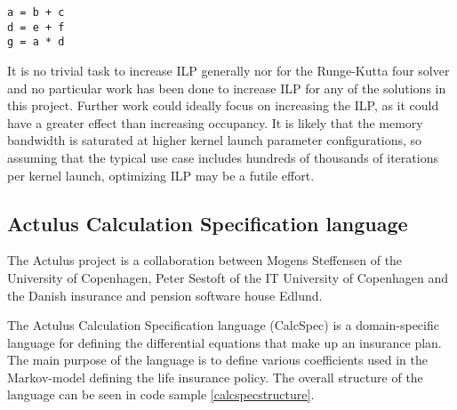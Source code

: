 \begin{lstlisting}[caption=ILP example program, label=ilpexample]
a = b + c
d = e + f
g = a * d
\end{lstlisting}

It is no trivial task to increase ILP generally nor for the Runge-Kutta four solver and no particular work has been done to increase ILP for any of the solutions in this project.
Further work could ideally focus on increasing the ILP, as it could have a greater effect than increasing occupancy\cite{volkovoccupancy}.
It is likely that the memory bandwidth is saturated at higher kernel launch parameter configurations, so assuming that the typical use case includes hundreds of thousands of iterations per kernel launch, optimizing ILP may be a futile effort.

\subsection{Actulus Calculation Specification language}\label{subsec:background:calcspec}
The Actulus project\cite{actulus} is a collaboration between Mogens Steffensen of the University of Copenhagen, Peter Sestoft of the IT University of Copenhagen and the Danish insurance and pension software house Edlund.

The Actulus Calculation Specification language (CalcSpec) is a domain-specific language for defining the differential equations that make up an insurance plan.
The main purpose of the language is to define various coefficients used in the Markov-model defining the life insurance policy.
The overall structure of the language can be seen in code sample \ref{calcspecstructure}.

